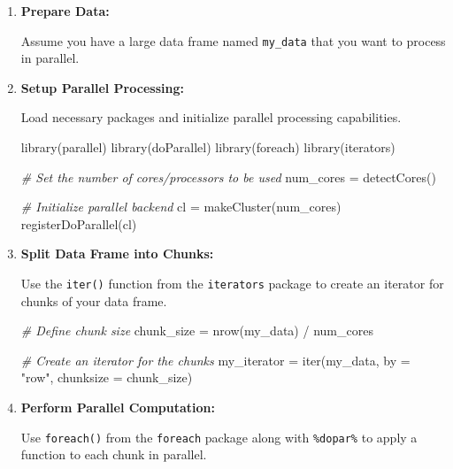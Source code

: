 \documentclass[
]{article}
\newenvironment{Shaded}{}{}
\newcommand{\AttributeTok}[1]{\textcolor[rgb]{0.49,0.56,0.16}{#1}}
\newcommand{\CommentTok}[1]{\textcolor[rgb]{0.38,0.63,0.69}{\textit{#1}}}
\newcommand{\FunctionTok}[1]{\textcolor[rgb]{0.02,0.16,0.49}{#1}}
\newcommand{\NormalTok}[1]{#1}
\newcommand{\OtherTok}[1]{\textcolor[rgb]{0.00,0.44,0.13}{#1}}
\newcommand{\SpecialCharTok}[1]{\textcolor[rgb]{0.25,0.44,0.63}{#1}}
\newcommand{\StringTok}[1]{\textcolor[rgb]{0.25,0.44,0.63}{#1}}
\begin{document}
\begin{enumerate}
\def\labelenumi{\arabic{enumi}.}
\item
  \textbf{Prepare Data:}

  Assume you have a large data frame named \texttt{my\_data} that you
  want to process in parallel.
\item
  \textbf{Setup Parallel Processing:}

  Load necessary packages and initialize parallel processing
  capabilities.

\begin{Shaded}
\begin{Highlighting}[]
 \FunctionTok{library}\NormalTok{(parallel)}
 \FunctionTok{library}\NormalTok{(doParallel)}
 \FunctionTok{library}\NormalTok{(foreach)}
 \FunctionTok{library}\NormalTok{(iterators)}

 \CommentTok{\# Set the number of cores/processors to be used}
\NormalTok{ num\_cores }\OtherTok{=} \FunctionTok{detectCores}\NormalTok{()}

 \CommentTok{\# Initialize parallel backend}
\NormalTok{ cl }\OtherTok{=} \FunctionTok{makeCluster}\NormalTok{(num\_cores)}
 \FunctionTok{registerDoParallel}\NormalTok{(cl)}
\end{Highlighting}
\end{Shaded}
\item
  \textbf{Split Data Frame into Chunks:}

  Use the \texttt{iter()} function from the \texttt{iterators} package
  to create an iterator for chunks of your data frame.

\begin{Shaded}
\begin{Highlighting}[]
 \CommentTok{\# Define chunk size}
\NormalTok{ chunk\_size }\OtherTok{=} \FunctionTok{nrow}\NormalTok{(my\_data) }\SpecialCharTok{/}\NormalTok{ num\_cores}

 \CommentTok{\# Create an iterator for the chunks}
\NormalTok{ my\_iterator }\OtherTok{=} \FunctionTok{iter}\NormalTok{(my\_data, }\AttributeTok{by =} \StringTok{"row"}\NormalTok{, }\AttributeTok{chunksize =}\NormalTok{ chunk\_size)}
\end{Highlighting}
\end{Shaded}
\item
  \textbf{Perform Parallel Computation:}

  Use \texttt{foreach()} from the \texttt{foreach} package along with
  \texttt{\%dopar\%} to apply a function to each chunk in parallel.


\end{enumerate}
\end{document}
